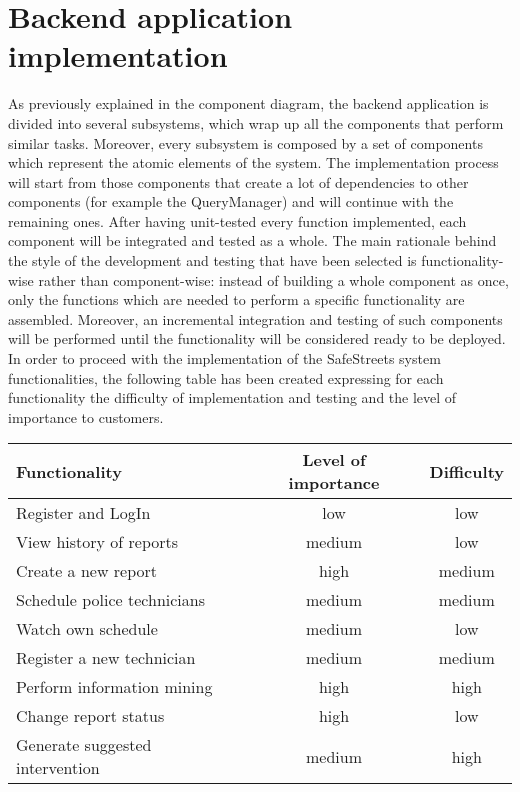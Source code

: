 \section{Backend application implementation}
As previously explained in the component diagram, the backend application is divided into several subsystems, which wrap up all the components that perform similar tasks. Moreover, every subsystem is composed by a set of components which represent the atomic elements of the system.
The implementation process will start from those components that create a lot of dependencies to other components (for example the QueryManager) and will continue with the remaining ones. After having unit-tested every function implemented, each component will be integrated and tested as a whole. 
The main rationale behind the style of the development and testing that have been selected is functionality-wise rather than component-wise: instead of building a whole component as once, only the functions which are needed to perform a specific functionality are assembled. Moreover, an incremental integration and testing of such components will be performed until the functionality will be considered ready to be deployed. In order to proceed with the implementation of the SafeStreets system functionalities, the following table has been created expressing for each functionality the difficulty of implementation and testing and the level of importance to customers.
\begin{table}[H]
    \centering
    \begin{tabularx}{\textwidth}{ |l|c|c| }
        \hline
        Functionality & Level of importance & Difficulty \\
        \hline
        Register and LogIn & low & low \\								
        \hline
        View history of reports & medium & low \\
        \hline
        Create a new report & high	& medium \\
        \hline								
        Schedule police technicians & medium & medium \\									
        \hline
        Watch own schedule & medium & low \\									
        \hline
        Register a new technician & medium & medium \\
        Perform information mining & high & high \\									
        \hline
        Change report status & high & low \\									
        \hline
        Generate suggested intervention & medium & high \\									
        \hline
    \end{tabularx}
  \end{table}
